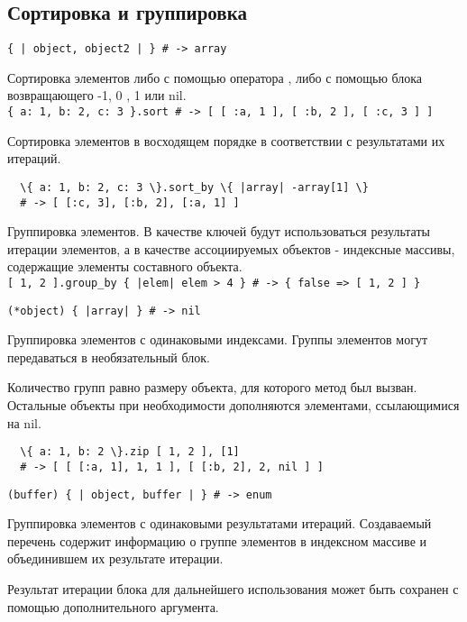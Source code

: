 \subsection*{Сортировка и группировка}

\begin{methodlist}
  \verb!{ | object, object2 | } # -> array!

  Сортировка элементов либо с помощью оператора \method{<=>}, либо с помощью блока возвращающего -1, 0 , 1 или nil. 
  \\\verb!{ a: 1, b: 2, c: 3 }.sort # -> [ [ :a, 1 ], [ :b, 2 ], [ :c, 3 ] ]!
 
  Сортировка элементов в восходящем порядке в соответствии с результатами их итераций.
  \begin{verbatim}
  \{ a: 1, b: 2, c: 3 \}.sort_by \{ |array| -array[1] \}
  # -> [ [:c, 3], [:b, 2], [:a, 1] ]
  \end{verbatim}  
 
  Группировка элементов. В качестве ключей будут использоваться результаты итерации элементов, а в качестве ассоциируемых объектов - индексные массивы, содержащие элементы составного объекта. 
  \\\verb![ 1, 2 ].group_by { |elem| elem > 4 } # -> { false => [ 1, 2 ] }!

  \verb!(*object) { |array| } # -> nil!

  Группировка элементов с одинаковыми индексами. Группы элементов могут передаваться в необязательный блок. 

  Количество групп равно размеру объекта, для которого метод был вызван. Остальные объекты при необходимости дополняются элементами, ссылающимися на nil.
  \begin{verbatim}
  \{ a: 1, b: 2 \}.zip [ 1, 2 ], [1]  
  # -> [ [ [:a, 1], 1, 1 ], [ [:b, 2], 2, nil ] ]
  \end{verbatim}

  \verb!(buffer) { | object, buffer | } # -> enum!

  Группировка элементов с одинаковыми результатами итераций. Создаваемый перечень содержит информацию о группе элементов в индексном массиве и объединившем их результате итерации. 

  Результат итерации блока для дальнейшего использования может быть сохранен с помощью дополнительного аргумента. 


\end{methodlist}
